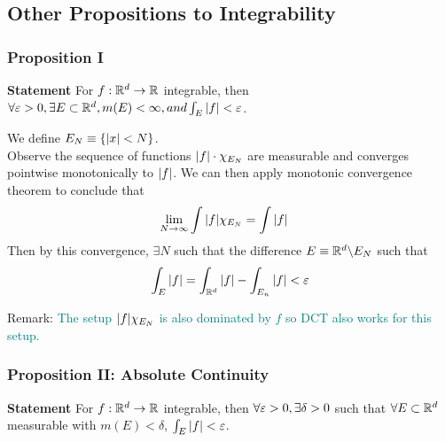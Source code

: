 \subsection{Other Propositions to Integrability}
\subsubsection{Proposition I}
\textbf{Statement} For $f: {\mathbb{R}}^d\to {\mathbb{R}}$ integrable, then $\forall {\varepsilon}>0, \exists E \subset {\mathbb{R}}^d, m(E)<\infty, and \int_E \abs{f}<{\varepsilon}$. \\

\begin{prf}
We define $E_N \equiv \qty{\abs{x}<N}$. \\
Observe the sequence of functions $\abs{f}\cdot \chi_{E_N}$ are measurable and converges pointwise monotonically to $\abs{f}$. We can then apply monotonic convergence theorem to conclude that
\begin{align*}
	\lim_{N\to\infty}\int\abs{f}\chi_{E_N} &= \int\abs{f}
\end{align*}
Then by this convergence, $\exists N$ such that the difference $E\equiv {\mathbb{R}}^d\backslash E_N$ such that
$$\int_{E} \abs{f} =\int_{{\mathbb{R}}^d}\abs{f} - \int_{E_n}\abs{f} <\varepsilon$$


Remark: \textcolor{teal}{The setup $\abs{f}\chi_{E_N}$ is also dominated by $f$ so DCT also works for this setup.}

\end{prf}

\subsubsection{Proposition II: Absolute Continuity}
\textbf{Statement} For $f: {\mathbb{R}}^d\to {\mathbb{R}}$ integrable, then $\forall {\varepsilon}>0, \exists \delta>0$ such that $\forall E\subset {\mathbb{R}}^d$ measurable with $m(E)<\delta$, $\int_E \abs{f}<{\varepsilon}$.\\ 

